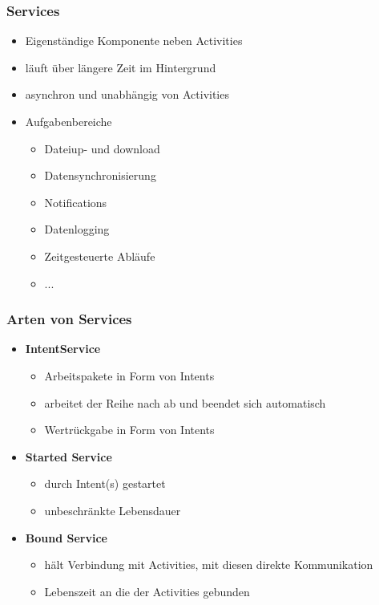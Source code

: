 \begin{frame}[c]
	\frametitle{Services}
	\begin{itemize}
	\item Eigenständige Komponente neben Activities \pause \medskip
	\item läuft über längere Zeit im Hintergrund \pause \medskip
	\item asynchron und unabhängig von Activities \pause \medskip
	\item Aufgabenbereiche
		\begin{itemize}
		\item Dateiup- und download \pause
		\item Datensynchronisierung \pause
		\item Notifications \pause
		\item Datenlogging \pause
		\item Zeitgesteuerte Abläufe
		\item ...
		\end{itemize}
	\end{itemize}
\end{frame}

\begin{frame}[c]
	\frametitle{Arten von Services}
	\begin{itemize}
	\item \textbf{IntentService}
		\begin{itemize}
		\item Arbeitspakete in Form von Intents \pause
		\item arbeitet der Reihe nach ab und beendet sich automatisch \pause
		\item Wertrückgabe in Form von Intents \pause
		\end{itemize}

	\bigskip
	\item \textbf{Started Service}
		\begin{itemize}
		\item durch Intent(s) gestartet \pause
		\item unbeschränkte Lebensdauer \pause
		\end{itemize}

	\bigskip
	\item \textbf{Bound Service}
		\begin{itemize}
		\item hält Verbindung mit Activities, mit diesen direkte Kommunikation \pause
		\item Lebenszeit an die der Activities gebunden
		\end{itemize}
	\end{itemize}
\end{frame}

